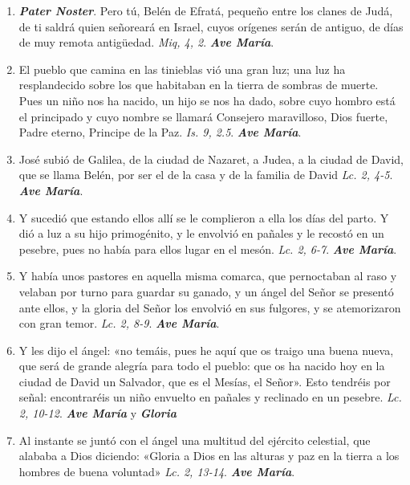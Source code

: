 \documentclass[11pt,a4paper]{book}
\begin{document}
    \begin{enumerate}
        \item \textbf{\emph{Pater Noster}}. Pero tú, Belén de Efratá, pequeño entre los clanes de Judá, de ti saldrá quien señoreará en Israel, cuyos
            orígenes serán de antiguo, de días de muy remota antigüedad. \emph{Miq, 4, 2}. \textbf{\emph{Ave María}}.

        \item El pueblo que camina en las tinieblas vió una gran luz; una luz ha resplandecido sobre los que habitaban en la tierra de sombras de muerte.
            Pues un niño nos ha nacido, un hijo se nos ha dado, sobre cuyo hombro está el principado y cuyo nombre se llamará Consejero maravilloso, 
            Dios fuerte, Padre eterno, Principe de la Paz. \emph{Is. 9, 2.5}. \textbf{\emph{Ave María}}.

        \item José subió de Galilea, de la ciudad de Nazaret, a Judea, a la ciudad de David, que se llama Belén, por ser el de la casa y de la familia de David 
            \emph{Lc. 2, 4-5}. \textbf{\emph{Ave María}}.

        \item Y sucedió que estando ellos allí se le complieron a ella los días del parto. Y dió a luz a su hijo primogénito, 
            y le envolvió en pañales y le recostó en un pesebre, pues no había para ellos lugar en el mesón. 
            \emph{Lc. 2, 6-7}. \textbf{\emph{Ave María}}.

        \item Y había unos pastores en aquella misma comarca, que pernoctaban al raso y velaban por turno para guardar su ganado, 
            y un ángel del Señor se presentó ante ellos, y la gloria del Señor los envolvió en sus fulgores, y se atemorizaron con gran temor. 
            \emph{Lc. 2, 8-9}. \textbf{\emph{Ave María}}.

        \item Y les dijo el ángel: «no temáis, pues he aquí que os traigo una buena nueva, que será de grande alegría para todo el pueblo: 
            que os ha nacido hoy en la ciudad de David un Salvador, que es el Mesías, el Señor». Esto tendréis por señal: encontraréis un 
            niño envuelto en pañales y reclinado en un pesebre. \emph{Lc. 2, 10-12}. \textbf{\emph{Ave María}} y \textbf{\emph{Gloria}}
        
        \item Al instante se juntó con el ángel una multitud del ejército celestial, que alababa a Dios diciendo: «Gloria a Dios en las alturas y paz en
            la tierra a los hombres de buena voluntad» \emph{Lc. 2, 13-14}. \textbf{\emph{Ave María}}.


\end{enumerate}
\end{document}
